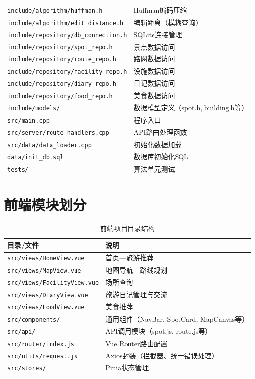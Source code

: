 \documentclass[12pt,a4paper]{report}
\begin{document}
\begin{table}[H]
\begin{tabularx}{\textwidth}{X l}
\texttt{include/algorithm/huffman.h} & Huffman编码压缩 \\
\texttt{include/algorithm/edit\_distance.h} & 编辑距离（模糊查询） \\
\texttt{include/repository/db\_connection.h} & SQLite连接管理 \\
\texttt{include/repository/spot\_repo.h} & 景点数据访问 \\
\texttt{include/repository/route\_repo.h} & 路网数据访问 \\
\texttt{include/repository/facility\_repo.h} & 设施数据访问 \\
\texttt{include/repository/diary\_repo.h} & 日记数据访问 \\
\texttt{include/repository/food\_repo.h} & 美食数据访问 \\
\texttt{include/models/} & 数据模型定义（spot.h, building.h等） \\
\midrule
\texttt{src/main.cpp} & 程序入口 \\
\texttt{src/server/route\_handlers.cpp} & API路由处理函数 \\
\texttt{src/data/data\_loader.cpp} & 初始化数据加载 \\
\texttt{data/init\_db.sql} & 数据库初始化SQL \\
\texttt{tests/} & 算法单元测试 \\
\bottomrule
\end{tabularx}
\end{table}

\section{前端模块划分}

\begin{table}[H]
\centering
\caption{前端项目目录结构}
\small
\begin{tabularx}{\textwidth}{X l}
\toprule
\textbf{目录/文件} & \textbf{说明} \\
\midrule
\texttt{src/views/HomeView.vue} & 首页---旅游推荐 \\
\texttt{src/views/MapView.vue} & 地图导航---路线规划 \\
\texttt{src/views/FacilityView.vue} & 场所查询 \\
\texttt{src/views/DiaryView.vue} & 旅游日记管理与交流 \\
\texttt{src/views/FoodView.vue} & 美食推荐 \\
\texttt{src/components/} & 通用组件（NavBar, SpotCard, MapCanvas等） \\
\texttt{src/api/} & API调用模块（spot.js, route.js等） \\
\texttt{src/router/index.js} & Vue Router路由配置 \\
\texttt{src/utils/request.js} & Axios封装（拦截器、统一错误处理） \\
\texttt{src/stores/} & Pinia状态管理 \\
\bottomrule
\end{tabularx}
\end{table}
\end{document}
